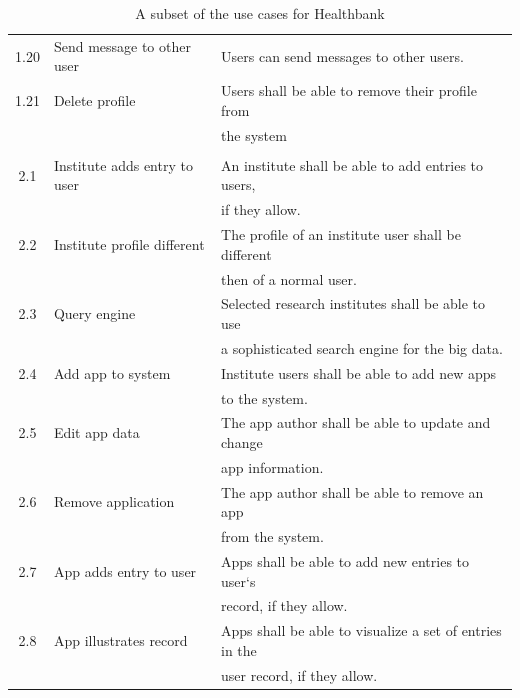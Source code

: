 \begin{table}[ht]
\begin{tabular}{c l l}
	1.20 & Send message to other user & Users can send messages to other users. \\
	1.21 & Delete profile & Users shall be able to remove their profile from  \\
	 & & the system \\
	\hline
	\\
	2.1 & Institute adds entry to user & An institute shall be able to add entries to users,  \\
	 & & if they allow. \\
	2.2 & Institute profile different & The profile of an institute user shall be different  \\
	 & & then of a normal user. \\
	2.3 & Query engine & Selected research institutes shall be able to use  \\
	 & & a sophisticated search engine for the big data. \\
	2.4 & Add app to system & Institute users shall be able to add new apps  \\
	 & & to the system. \\
	2.5 & Edit app data & The app author shall be able to update and change  \\
	 & & app information. \\
	2.6 & Remove application & The app author shall be able to remove an app  \\
	 & & from the system. \\
	2.7 & App adds entry to user & Apps shall be able to add new entries to user`s  \\
	 & & record, if they allow. \\
	2.8 & App illustrates record & Apps shall be able to visualize a set of entries in the  \\
	 & & user record, if they allow. \\
	\end{tabular}
	\caption{A subset of the use cases for Healthbank}
  \label{tab:usecaseTable}
\end{table}
 
 
